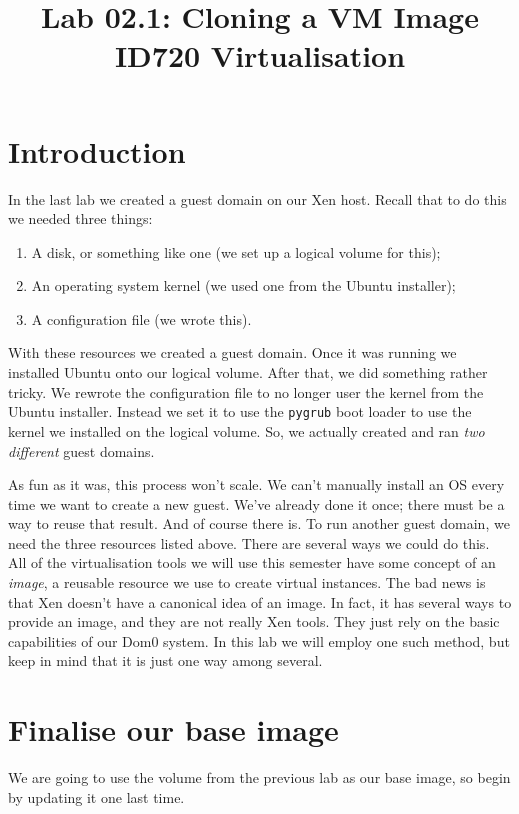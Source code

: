 \documentclass{article}
\begin{document}
\title{Lab 02.1: Cloning a VM Image\\ ID720 Virtualisation}
\date{}
\maketitle

\section*{Introduction}
In the last lab we created a guest domain on our Xen host. Recall that to do this we needed three things:

\begin{enumerate}
  \item A disk, or something like one (we set up a logical volume for this);
  \item An operating system kernel (we used one from the Ubuntu installer);
  \item A configuration file (we wrote this).
\end{enumerate}

With these resources we created a guest domain. Once it was running we installed Ubuntu onto our logical volume. After that, we did something 
rather tricky. We rewrote the configuration file to no longer user the kernel from the Ubuntu installer. Instead we set it to use the \texttt{pygrub}
boot loader to use the kernel we installed on the logical volume. So, we actually created and ran \emph{two different} guest domains.

As fun as it was, this process won't scale. We can't manually install an OS every time we want to create a new guest. We've already done it once; there
must be a way to reuse that result. And of course there is. To run another guest domain, we need the three resources listed above. There are several ways we could do this. All of the virtualisation tools we will use this semester have some concept of an \emph{image}, a reusable resource we use to create virtual instances. The bad news is that Xen doesn't have a canonical idea of an image. In fact, it has several ways to provide an image, and they are not really Xen tools. They just rely on the basic capabilities of our Dom0 system. In this lab we will employ one such method, but keep in mind that it is just one way among several.

\section{Finalise our base image}
We are going to use the volume from the previous lab as our base image, so begin by updating it one last time.
\end{document}
